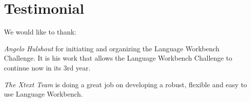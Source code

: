 \section*{Testimonial}

We would like to thank:
\begin{compactenum}
  \item \emph{Angelo Hulshout} for initiating and organizing the Language
  Workbench Challenge. It is his work that allows the Language Workbench
  Challenge to continue now in its 3rd year.
  \item \emph{The Xtext Team} is doing a great job on developing a robust,
  flexible and easy to use Language Workbench. 
\end{compactenum}
